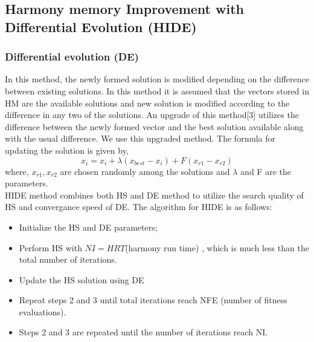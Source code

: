 \documentclass[letterpaper, 10 pt, conference]{ieeeconf}  %
\begin{document}
\subsection{Harmony memory Improvement with Differential Evolution (HIDE)}
\subsubsection*{Differential evolution (DE)} In this method, the newly formed solution is modified depending on the difference between existing solutions. In this method it is assumed that the vectors stored in HM are the available solutions and new solution is modified according to the difference in any two of the solutions. An upgrade of this method[3] utilizes the difference between the newly formed vector and the best solution available along with the usual difference. We use this upgraded method. The formula for updating the solution is given by, \[x_{i} = x_i + \lambda(x_{best}-x_i) + F(x_{r1}-x_{r2})\] where, $x_{r1}, x_{r2}$ are chosen randomly among the solutions and $\lambda$ and F are the parameters.\vspace*{1mm}\\
HIDE method combines both HS and DE method to utilize the search quality of HS and convergance speed of DE. The algorithm for HIDE is as follows:
\begin{itemize}
 \item Initialize the HS and DE parameters;
\item Perform HS with $NI = HRT$(harmony run time) , which is much less than the total number of iterations.
\item Update the HS solution using DE
\item Repeat steps 2 and 3 until total iterations reach NFE (number of fitness evaluations).
\item Steps 2 and 3 are repeated until the number of iterations reach NI.
\end{itemize}
\end{document}
